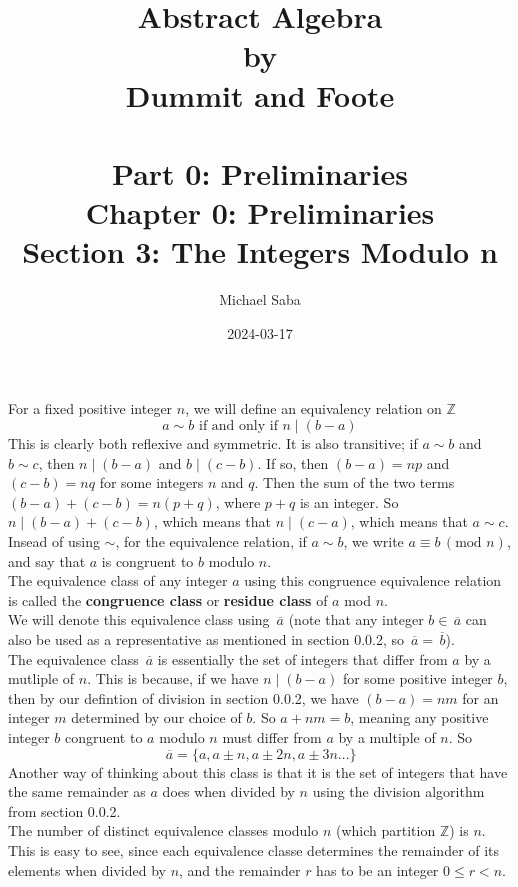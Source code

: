 \documentclass[12pt]{article}
\title{%
    \Huge Abstract Algebra \\
    \large by \\
    \Large Dummit and Foote \\~\\
    \huge Part 0: Preliminaries \\
    \LARGE Chapter 0: Preliminaries \\
    \Large Section 3: The Integers Modulo n
}
\date{2024-03-17}
\author{Michael Saba}
\newcommand{\Z}{\mathbb{Z}}
\newcommand{\olsi}[1]{\,\overline{\!{#1}}}
\begin{document}
    \maketitle
    \newpage

    For a fixed positive integer $n$,
    we will define an equivalency relation on $\Z$
    \[ a \sim b \text{ if and only if } n \mid (b - a) \]
    This is clearly both reflexive and symmetric.
    It is also transitive;
    if $a \sim b$ and $b \sim c$,
    then $n \mid (b-a)$ and $b \mid (c-b)$.
    If so, then $(b-a) = np$ and $(c-b) = nq$
    for some integers $n$ and $q$.
    Then the sum of the two terms $(b-a) + (c-b) = n(p+q)$,
    where $p+q$ is an integer.
    So $n \mid (b-a) + (c-b)$,
    which means that $n \mid (c-a)$,
    which means that $a \sim c$. \\
    Insead of using $\sim$,
    for the equivalence relation,
    if $a \sim b$,
    we write $a \equiv b \, (\text{mod }n)$,
    and say that $a$ is congruent to $b$ modulo $n$. \\
    The equivalence class of any integer $a$
    using this congruence equivalence relation
    is called the \textbf{congruence class} or \textbf{residue class}
    of $a$ mod $n$. \\
    We will denote this equivalence class using $\olsi{a}$
    (note that any integer $b \in \olsi{a}$ can also be used
    as a representative as mentioned in section 0.0.2,
    so $\olsi{a} = \olsi{b}$). \\

    The equivalence class $\olsi{a}$ is essentially the set 
    of integers that differ from $a$ by a mutliple of $n$.
    This is because, if we have $n \mid (b - a)$
    for some positive integer $b$,
    then by our defintion of division in section 0.0.2,
    we have $(b-a) = nm$ for an integer $m$
    determined by our choice of $b$.
    So $a + nm = b$,
    meaning any positive integer $b$ congruent to $a$ modulo $n$
    must differ from $a$ by a multiple of $n$.
    So
    \[ \olsi{a} = \{ a, a \pm n, a \pm 2n, a \pm 3n \dots \} \]
    Another way of thinking about this class is that it is the set
    of integers that have the same remainder as $a$ does
    when divided by $n$ using the division algorithm from section 0.0.2. \\

    The number of distinct equivalence classes modulo $n$
    (which partition $\Z$) is $n$.
    This is easy to see, since each equivalence classe
    determines the remainder of its elements when divided by $n$,
    and the remainder $r$ has to be an integer $0 \leqslant r < n$. \\
    
\end{document}
